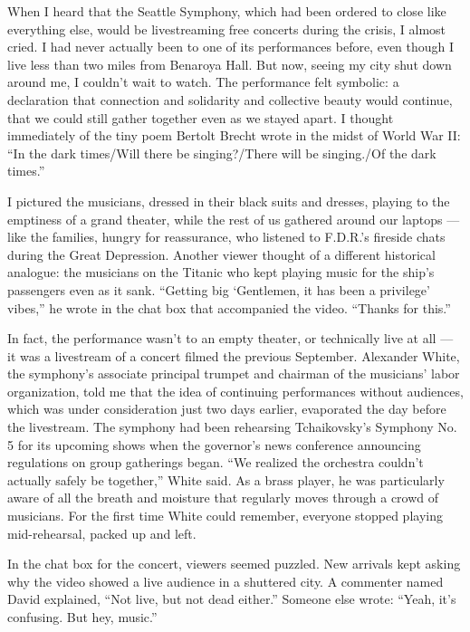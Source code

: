 When I heard that the Seattle Symphony, which had been ordered to close
like everything else, would be livestreaming free concerts during the
crisis, I almost cried. I had never actually been to one of its
performances before, even though I live less than two miles from
Benaroya Hall. But now, seeing my city shut down around me, I couldn't
wait to watch. The performance felt symbolic: a declaration that
connection and solidarity and collective beauty would continue, that we
could still gather together even as we stayed apart. I thought
immediately of the tiny poem Bertolt Brecht wrote in the midst of World
War II: ``In the dark times/Will there be singing?/There will be
singing./Of the dark times.''

I pictured the musicians, dressed in their black suits and dresses,
playing to the emptiness of a grand theater, while the rest of us
gathered around our laptops --- like the families, hungry for
reassurance, who listened to F.D.R.'s fireside chats during the Great
Depression. Another viewer thought of a different historical analogue:
the musicians on the Titanic who kept playing music for the ship's
passengers even as it sank. ``Getting big `Gentlemen, it has been a
privilege' vibes,'' he wrote in the chat box that accompanied the video.
``Thanks for this.''

In fact, the performance wasn't to an empty theater, or technically live
at all --- it was a livestream of a concert filmed the previous
September. Alexander White, the symphony's associate principal trumpet
and chairman of the musicians' labor organization, told me that the idea
of continuing performances without audiences, which was under
consideration just two days earlier, evaporated the day before the
livestream. The symphony had been rehearsing Tchaikovsky's Symphony No.
5 for its upcoming shows when the governor's news conference announcing
regulations on group gatherings began. ``We realized the orchestra
couldn't actually safely be together,'' White said. As a brass player,
he was particularly aware of all the breath and moisture that regularly
moves through a crowd of musicians. For the first time White could
remember, everyone stopped playing mid-rehearsal, packed up and left.

In the chat box for the concert, viewers seemed puzzled. New arrivals
kept asking why the video showed a live audience in a shuttered city. A
commenter named David explained, ``Not live, but not dead either.''
Someone else wrote: ``Yeah, it's confusing. But hey, music.''

